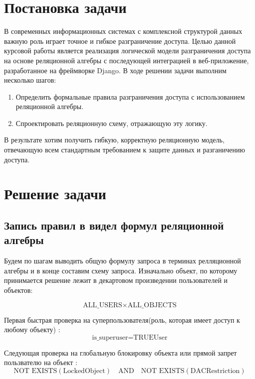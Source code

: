 \documentclass[14pt, a4paper]{extarticle}
\begin{document}
\section{Постановка задачи}
В современных информационных системах с комплексной структурой данных важную роль играет точное и гибкое разграничение доступа.
Целью данной курсовой работы является реализация логической модели разграничения доступа на основе реляционной алгебры с последующей интеграцией в веб-приложение, разработанное на фреймворке Django.
В ходе решении задачи выполним несколько шагов:
\begin{enumerate}
    \item Определить формальные правила разграничения доступа с использованием реляционной алгебры.
    \item Спроектировать реляционную схему, отражающую эту логику.
\end{enumerate}
В результате хотим получить гибкую, корректную реляционную модель, отвечающую всем стандартным требованием к защите данных и разганичению доступа.
\section{Решение задачи}

\subsection{Запись правил в видел формул реляционной алгебры}
Будем по шагам выводить общую формулу запроса в терминах релляционной алгебры и в конце составим схему запроса.
Изначально объект, по которому принимается решение лежит в декартовом произведении пользователей и объектов:

\[
\text{ALL\_USERS} \times \text{ALL\_OBJECTS}
\]

Первая быстрая проверка на суперпользователя(роль, которая имеет доступ к любому объекту) :
\[
\text{is\_superuser} = \text{TRUE} \text{User} 
\]

Следующая проверка на глобальную блокировку объекта или прямой запрет пользвателю на объект :
\[
\text{NOT EXISTS}(\text{LockedObject}) \quad \text{AND} \quad \text{NOT EXISTS}(\text{DACRestriction})
\]
\end{document}
